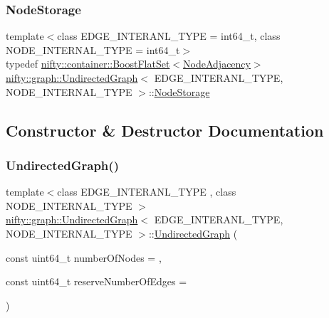 \mbox{\label{classnifty_1_1graph_1_1UndirectedGraph_a6e9a6dd89601d6f9039492053dc9f2a8}} 
\subsubsection{\texorpdfstring{Node\+Storage}{NodeStorage}}
{\footnotesize\ttfamily template$<$class E\+D\+G\+E\+\_\+\+I\+N\+T\+E\+R\+A\+N\+L\+\_\+\+T\+Y\+PE = int64\+\_\+t, class N\+O\+D\+E\+\_\+\+I\+N\+T\+E\+R\+N\+A\+L\+\_\+\+T\+Y\+PE = int64\+\_\+t$>$ \\
typedef \hyperlink{namespacenifty_1_1container_ad9f6bbba60eac29f50d418e4c09d5c7b}{nifty\+::container\+::\+Boost\+Flat\+Set}$<$\hyperlink{classnifty_1_1graph_1_1UndirectedGraph_ab50d4774bd9a93ac226589352866df69}{Node\+Adjacency}$>$ \hyperlink{classnifty_1_1graph_1_1UndirectedGraph}{nifty\+::graph\+::\+Undirected\+Graph}$<$ E\+D\+G\+E\+\_\+\+I\+N\+T\+E\+R\+A\+N\+L\+\_\+\+T\+Y\+PE, N\+O\+D\+E\+\_\+\+I\+N\+T\+E\+R\+N\+A\+L\+\_\+\+T\+Y\+PE $>$\+::\hyperlink{classnifty_1_1graph_1_1UndirectedGraph_a6e9a6dd89601d6f9039492053dc9f2a8}{Node\+Storage}\hspace{0.3cm}{\ttfamily [protected]}}



\subsection{Constructor \& Destructor Documentation}
\mbox{\label{classnifty_1_1graph_1_1UndirectedGraph_a3c2087810feadcef80e0a1a1ca288b43}} 
\subsubsection{\texorpdfstring{Undirected\+Graph()}{UndirectedGraph()}}
{\footnotesize\ttfamily template$<$class E\+D\+G\+E\+\_\+\+I\+N\+T\+E\+R\+A\+N\+L\+\_\+\+T\+Y\+PE , class N\+O\+D\+E\+\_\+\+I\+N\+T\+E\+R\+N\+A\+L\+\_\+\+T\+Y\+PE $>$ \\
\hyperlink{classnifty_1_1graph_1_1UndirectedGraph}{nifty\+::graph\+::\+Undirected\+Graph}$<$ E\+D\+G\+E\+\_\+\+I\+N\+T\+E\+R\+A\+N\+L\+\_\+\+T\+Y\+PE, N\+O\+D\+E\+\_\+\+I\+N\+T\+E\+R\+N\+A\+L\+\_\+\+T\+Y\+PE $>$\+::\hyperlink{classnifty_1_1graph_1_1UndirectedGraph}{Undirected\+Graph} (\begin{DoxyParamCaption}\item[{const uint64\+\_\+t}]{number\+Of\+Nodes = {},  }\item[{const uint64\+\_\+t}]{reserve\+Number\+Of\+Edges = {} }\end{DoxyParamCaption})}



